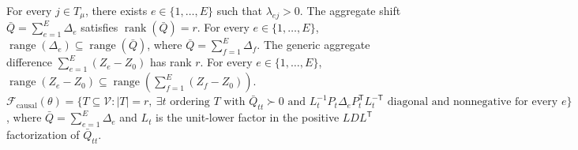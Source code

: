 For every \(j\in T_{\mu}\), there exists \(e\in\{1,\ldots,E\}\) such that \(\lambda_{ej}>0\).
The aggregate shift \(\bar Q=\sum_{e=1}^E\Delta_e\) satisfies \(\operatorname{rank}(\bar Q)=r\).
For every \(e\in\{1,\ldots,E\}\), \(\operatorname{range}(\Delta_e)\subseteq\operatorname{range}(\bar Q)\), where \(\bar Q=\sum_{f=1}^E\Delta_f\).
The generic aggregate difference \(\sum_{e=1}^E(Z_e-Z_0)\) has rank \(r\).
For every \(e\in\{1,\ldots,E\}\), \(\operatorname{range}(Z_e-Z_0)\subseteq\operatorname{range}(\sum_{f=1}^E(Z_f-Z_0))\).
\(\mathcal F_{\mathrm{causal}}(\theta)=\{T\subseteq\mathcal V:|T|=r,\ \exists t\text{ ordering }T\text{ with }\bar Q_{tt}\succ0\text{ and }L_t^{-1}P_t\Delta_eP_t^{\mathsf T}L_t^{-\mathsf T}\text{ diagonal and nonnegative for every }e\}\), where \(\bar Q=\sum_{e=1}^E\Delta_e\) and \(L_t\) is the unit-lower factor in the positive \(LDL^{\mathsf T}\) factorization of \(\bar Q_{tt}\).
